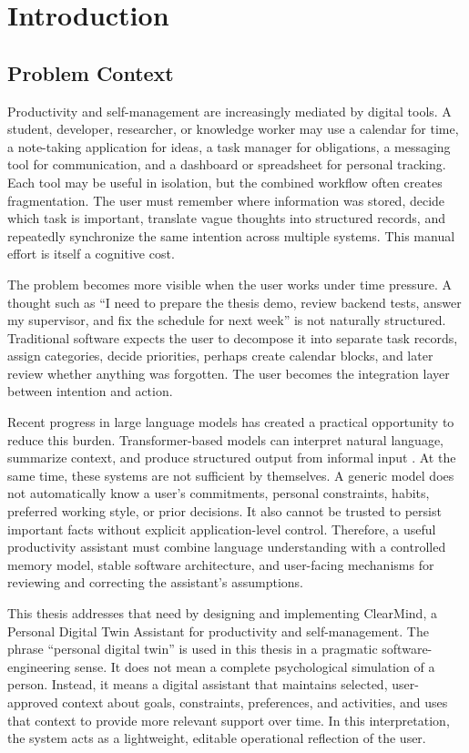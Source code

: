 \chapter{Introduction}

\section{Problem Context}

Productivity and self-management are increasingly mediated by digital tools. A student, developer, researcher, or knowledge worker may use a calendar for time, a note-taking application for ideas, a task manager for obligations, a messaging tool for communication, and a dashboard or spreadsheet for personal tracking. Each tool may be useful in isolation, but the combined workflow often creates fragmentation. The user must remember where information was stored, decide which task is important, translate vague thoughts into structured records, and repeatedly synchronize the same intention across multiple systems. This manual effort is itself a cognitive cost.

The problem becomes more visible when the user works under time pressure. A thought such as ``I need to prepare the thesis demo, review backend tests, answer my supervisor, and fix the schedule for next week'' is not naturally structured. Traditional software expects the user to decompose it into separate task records, assign categories, decide priorities, perhaps create calendar blocks, and later review whether anything was forgotten. The user becomes the integration layer between intention and action.

Recent progress in large language models has created a practical opportunity to reduce this burden. Transformer-based models can interpret natural language, summarize context, and produce structured output from informal input \cite{vaswani2017attention,brown2020language}. At the same time, these systems are not sufficient by themselves. A generic model does not automatically know a user's commitments, personal constraints, habits, preferred working style, or prior decisions. It also cannot be trusted to persist important facts without explicit application-level control. Therefore, a useful productivity assistant must combine language understanding with a controlled memory model, stable software architecture, and user-facing mechanisms for reviewing and correcting the assistant's assumptions.

This thesis addresses that need by designing and implementing ClearMind, a Personal Digital Twin Assistant for productivity and self-management. The phrase ``personal digital twin'' is used in this thesis in a pragmatic software-engineering sense. It does not mean a complete psychological simulation of a person. Instead, it means a digital assistant that maintains selected, user-approved context about goals, constraints, preferences, and activities, and uses that context to provide more relevant support over time. In this interpretation, the system acts as a lightweight, editable operational reflection of the user.

